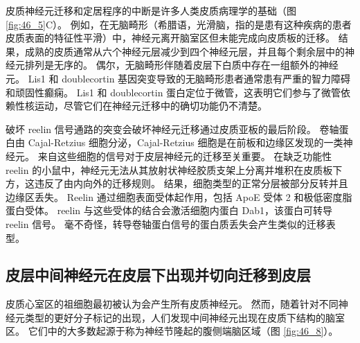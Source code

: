 皮质神经元迁移和定居程序的中断是许多人类皮质病理学的基础（图 \ref{fig:46_5}C）。 例如，在无脑畸形（希腊语，光滑脑，指的是患有这种疾病的患者皮质表面的特征性平滑）中，神经元离开脑室区但未能完成向皮质板的迁移。 结果，成熟的皮质通常从六个神经元层减少到四个神经元层，并且每个剩余层中的神经元排列是无序的。 偶尔，无脑畸形伴随着皮层下白质中存在一组额外的神经元。 Lis1 和 doublecortin 基因突变导致的无脑畸形患者通常患有严重的智力障碍和顽固性癫痫。 Lis1 和 doublecortin 蛋白定位于微管，这表明它们参与了微管依赖性核运动，尽管它们在神经元迁移中的确切功能仍不清楚。

破坏 reelin 信号通路的突变会破坏神经元迁移通过皮质亚板的最后阶段。 卷轴蛋白由 Cajal-Retzius 细胞分泌，Cajal-Retzius 细胞是在前板和边缘区发现的一类神经元。 来自这些细胞的信号对于皮层神经元的迁移至关重要。 在缺乏功能性 reelin 的小鼠中，神经元无法从其放射状神经胶质支架上分离并堆积在皮质板下方，这违反了由内向外的迁移规则。 结果，细胞类型的正常分层被部分反转并且边缘区丢失。 Reelin 通过细胞表面受体起作用，包括 ApoE 受体 2 和极低密度脂蛋白受体。 reelin 与这些受体的结合会激活细胞内蛋白 Dab1，该蛋白可转导 reelin 信号。 毫不奇怪，转导卷轴蛋白信号的蛋白质丢失会产生类似的迁移表型。

\subsection{皮层中间神经元在皮层下出现并切向迁移到皮层}
皮质心室区的祖细胞最初被认为会产生所有皮质神经元。 然而，随着针对不同神经元类型的更好分子标记的出现，人们发现中间神经元出现在皮质下结构的脑室区。 
它们中的大多数起源于称为神经节隆起的腹侧端脑区域（图 \ref{fig:46_8}）。

